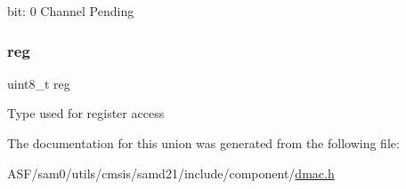 bit\+: 0 Channel Pending \mbox{\label{union_d_m_a_c___c_h_s_t_a_t_u_s___type_a9428adc9af4653a2050e2536b55dec8d}} 
\subsubsection{\texorpdfstring{reg}{reg}}
{\footnotesize\ttfamily uint8\+\_\+t reg}

Type used for register access 

The documentation for this union was generated from the following file\+:\begin{DoxyCompactItemize}
\item 
A\+S\+F/sam0/utils/cmsis/samd21/include/component/\mbox{\hyperlink{component_2dmac_8h}{dmac.\+h}}\end{DoxyCompactItemize}

